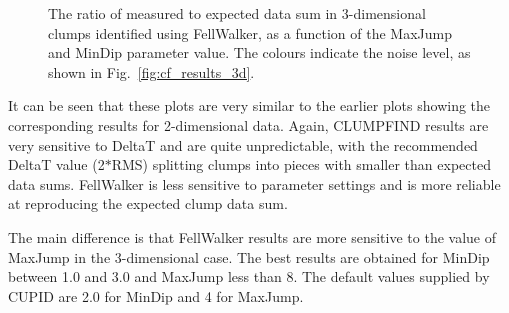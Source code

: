 \documentclass[final,authoryear,5p,times,twocolumn]{elsarticle}
\begin{document}
\begin{figure}
\hspace*{10pt}
\caption{The ratio of measured to expected data sum in 3-dimensional clumps identified
using FellWalker, as a function of the MaxJump and MinDip parameter value.
The colours indicate the noise level, as shown in
Fig.~\ref{fig:cf_results_3d}.}
\label{fig:fw_results_3d}
\end{figure}

It can be seen that these plots are very similar to the earlier plots
showing the corresponding results for 2-dimensional data. Again,
CLUMPFIND results are very sensitive to DeltaT and are quite
unpredictable, with the recommended DeltaT value (2$*$RMS) splitting
clumps into pieces with smaller than expected data sums. FellWalker is
less sensitive to parameter settings and is more reliable at reproducing
the expected clump data sum.

The main difference is that FellWalker results are more sensitive to the
value of MaxJump in the 3-dimensional case. The best results are obtained
for MinDip between 1.0 and 3.0 and MaxJump less than 8. The default
values supplied by CUPID are 2.0 for MinDip and 4 for MaxJump.
\end{document}
